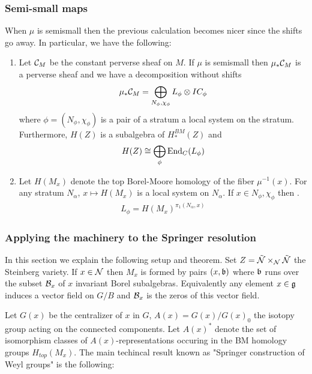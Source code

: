 \subsubsection{Semi-small maps}
When $\mu$ is semismall then the previous calculation becomes nicer 
since the shifts go away. In particular, we have the following: 
\begin{theorem}
    \begin{enumerate}
        \item Let ${\mathcal{C}}_M$ be the constant perverse sheaf on $M$. If $\mu$ is semismall
        then $\mu_*{\mathcal{C}}_M$ is a perverse sheaf and we have a decomposition without shifts \begin{align*}
            \mu_*{\mathcal{C}}_M = \bigoplus_{N_\phi,\chi_\phi} L_\phi \otimes IC_\phi
        \end{align*} where $\phi = (N_\phi,\chi_\phi)$ is a pair of a stratum
        a local system on the stratum. Furthermore, $H(Z)$ is a
        subalgebra of $H^{BM}_*(Z)$ and \begin{align*}
            H(Z) \cong \bigoplus_\phi \operatorname{End}_C(L_\phi)
        \end{align*}
        \item Let $H(M_x)$ denote the top 
        Borel-Moore homology of the fiber $\mu^{-1}(x)$. For any 
        stratum $N_\alpha$, $x\mapsto H(M_x)$ is a local system on $N_\alpha$.
        If $x\in N_\phi,\chi_\phi$ then . \begin{align*}
            L_\phi = H(M_x)^{\pi_1(N_\alpha,x)}
        \end{align*}
    \end{enumerate}
\end{theorem}
\subsubsection{Applying the machinery to the Springer resolution}
In this section we explain the following setup and theorem.
Set $Z = \tilde {{\mathcal{N}}}\times_{\mathcal{N}} \tilde {{\mathcal{N}}}$ the Steinberg variety.
If $x\in {\mathcal{N}}$ then $M_x$ is formed by pairs $(x,\mathfrak{b})$ where $\mathfrak{b}$ 
runs over the subset ${\mathcal{B}}_x$ of $x$ invariant Borel subalgebras. Equivalently 
any element $x\in \mathfrak{g}$ induces a vector field on $G/B$ and ${\mathcal{B}}_x$ is the
zeros of this vector field.

\hfill 

Let $G(x)$ be the centralizer of $x$ in $G$, $A(x) = G(x)/G(x)_0$ the isotopy
group acting on the connected components. Let $A(x)^*$ denote the set of isomorphism classes
of $A(x)$-representations occuring in the BM homology groups $H_{top}(M_x)$.
The main techincal result known as "Springer construction of Weyl groups"
is the following:

